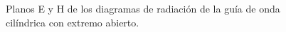\begin{figure} [H]
\centering 
{}
\hspace{5mm}
\caption{Planos E y H de los diagramas de radiación de la guía de onda cilíndrica con extremo abierto.}
\label{grup_fig_estudio:6}
\end{figure}
